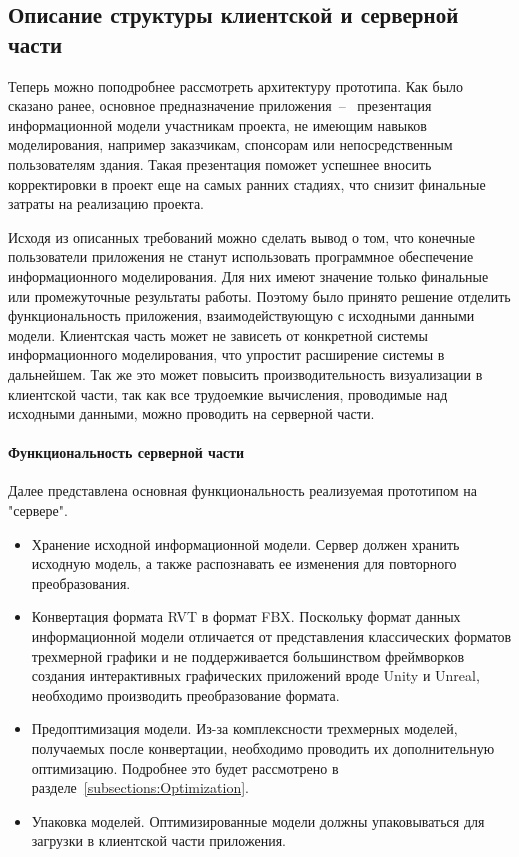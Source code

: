 ﻿\subsection{Описание структуры клиентской и серверной части}
\label{subsections:ClientServerDesign}

Теперь можно поподробнее рассмотреть архитектуру прототипа.
Как было сказано ранее, основное предназначение приложения~--~
презентация информационной модели участникам проекта,
не имеющим навыков моделирования,
например заказчикам, спонсорам или непосредственным пользователям здания.
Такая презентация поможет успешнее вносить
корректировки в проект еще на самых ранних стадиях,
что снизит финальные затраты на реализацию проекта.%
\cite{Davidson2019}

Исходя из описанных требований можно сделать вывод о том,
что конечные пользователи приложения не станут использовать
программное обеспечение информационного моделирования.
Для них имеют значение только финальные или промежуточные результаты работы.
Поэтому было принято решение отделить функциональность приложения,
взаимодействующую с исходными данными модели.
Клиентская часть может не зависеть
от конкретной системы информационного моделирования,
что упростит расширение системы в дальнейшем.
Так же это может повысить производительность визуализации в клиентской части,
так как все трудоемкие вычисления, проводимые над исходными данными,
можно проводить на серверной части.

\paragraph{Функциональность серверной части}

Далее представлена основная функциональность реализуемая прототипом на "сервере".

\begin{itemize}
    \item {
        Хранение исходной информационной модели.
        Сервер должен хранить исходную модель,
        а также распознавать ее изменения для повторного преобразования.
    }
    \item {
        Конвертация формата RVT в формат FBX.
        Поскольку формат данных информационной модели отличается от
        представления классических форматов трехмерной графики
        и не поддерживается большинством фреймворков
        создания интерактивных графических приложений
        вроде Unity и Unreal, необходимо производить
        преобразование формата.
    } 
    \item {
        Предоптимизация модели.
        Из-за комплексности трехмерных моделей,
        получаемых после конвертации,
        необходимо проводить их дополнительную оптимизацию.
        Подробнее это будет рассмотрено в разделе~\ref{subsections:Optimization}.
    }
    \item {
        Упаковка моделей.
        Оптимизированные модели должны упаковываться для
        загрузки в клиентской части приложения.
    }
\end{itemize}

